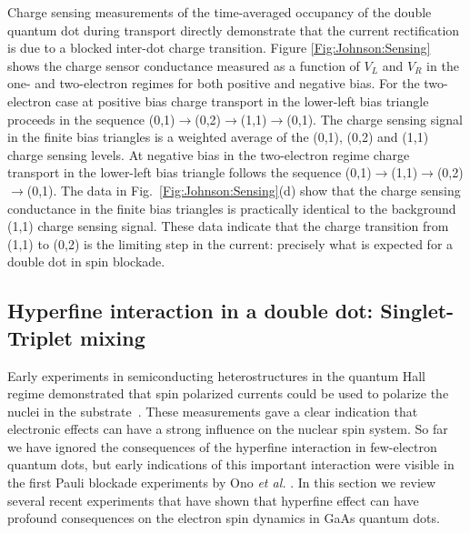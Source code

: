 \documentclass[rmp,twocolumn,aps]{revtex4}
\begin{document}
Charge sensing measurements of the time-averaged occupancy of the
double quantum dot during transport directly demonstrate that the
current rectification is due to a blocked inter-dot charge
transition. Figure \ref{Fig:Johnson:Sensing} shows the charge
sensor conductance measured as a function of $V_L$ and $V_R$ in
the one- and two-electron regimes for both positive and negative
bias. For the two-electron case at positive bias charge transport
in the lower-left bias triangle proceeds in the sequence
(0,1)$\rightarrow$(0,2)$\rightarrow$(1,1)$\rightarrow$(0,1). The
charge sensing signal in the finite bias triangles is a weighted
average of the (0,1), (0,2) and (1,1) charge sensing levels. At
negative bias in the two-electron regime charge transport in the
lower-left bias triangle follows the sequence
(0,1)$\rightarrow$(1,1)$\rightarrow$(0,2)$\rightarrow$(0,1). The
data in Fig.\ \ref{Fig:Johnson:Sensing}(d) show that the charge
sensing conductance in the finite bias triangles is practically
identical to the background (1,1) charge sensing signal. These
data indicate that the charge transition from (1,1) to (0,2) is
the limiting step in the current: precisely what is expected for a
double dot in spin blockade.

\subsection{Hyperfine interaction in a double dot: Singlet-Triplet mixing}
\label{Section:STmixing} Early experiments in semiconducting
heterostructures in the quantum Hall regime demonstrated that spin
polarized currents could be used to polarize the nuclei in the
substrate~\cite{wald94,dixon97}. These measurements gave a clear indication that
electronic effects can have a strong influence on the nuclear spin
system. So far we have ignored the consequences of the hyperfine
interaction in few-electron quantum dots, but early indications of
this important interaction were visible in the first Pauli
blockade experiments by Ono \textit{et al.} \cite{OnoSpinBlock}.
In this section we review several recent experiments that have
shown that hyperfine effect can have profound consequences on the
electron spin dynamics in GaAs quantum dots.
\end{document}

